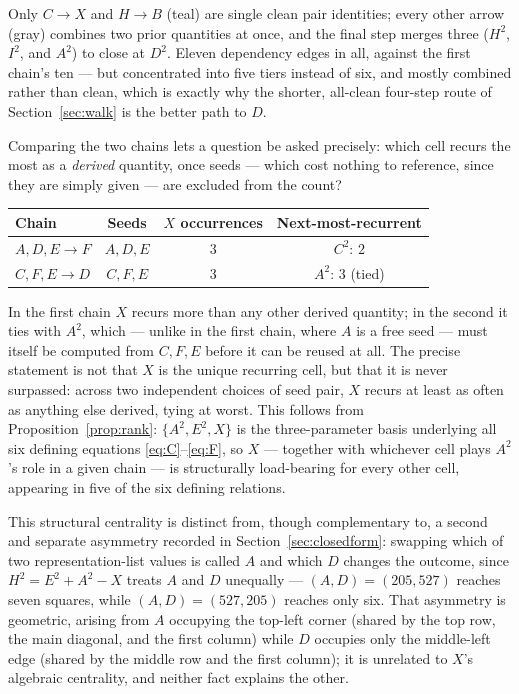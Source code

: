 \documentclass[12pt]{article}
\theoremstyle{remark}
\begin{document}
Only $C \to X$ and $H \to B$ (teal) are single clean pair identities;
every other arrow (gray) combines two prior quantities at once, and
the final step merges three ($H^2$, $I^2$, and $A^2$) to close at
$D^2$. Eleven dependency edges in all, against the first chain's ten
--- but concentrated into five tiers instead of six, and mostly
combined rather than clean, which is exactly why the shorter,
all-clean four-step route of Section~\ref{sec:walk} is the better path
to $D$.

Comparing the two chains lets a question be asked precisely: which
cell recurs the most as a \emph{derived} quantity, once seeds --- which
cost nothing to reference, since they are simply given --- are excluded
from the count?

\begin{center}
\begin{tabular}{lccc}
\hline
Chain & Seeds & $X$ occurrences & Next-most-recurrent \\
\hline
$A,D,E \to F$ & $A,D,E$ & $3$ & $C^2$: $2$ \\
$C,F,E \to D$ & $C,F,E$ & $3$ & $A^2$: $3$ (tied) \\
\hline
\end{tabular}
\end{center}

In the first chain $X$ recurs more than any other derived quantity; in
the second it ties with $A^2$, which --- unlike in the first chain,
where $A$ is a free seed --- must itself be computed from $C,F,E$
before it can be reused at all. The precise statement is not that $X$
is the unique recurring cell, but that it is never surpassed: across
two independent choices of seed pair, $X$ recurs at least as often as
anything else derived, tying at worst. This follows from
Proposition~\ref{prop:rank}: $\{A^2,E^2,X\}$ is the three-parameter
basis underlying all six defining equations
\eqref{eq:C}--\eqref{eq:F}, so $X$ --- together with whichever cell
plays $A^2$'s role in a given chain --- is structurally load-bearing
for every other cell, appearing in five of the six defining relations.

This structural centrality is distinct from, though complementary to,
a second and separate asymmetry recorded in
Section~\ref{sec:closedform}: swapping which of two representation-list
values is called $A$ and which $D$ changes the outcome, since
$H^2=E^2+A^2-X$ treats $A$ and $D$ unequally --- $(A,D)=(205,527)$
reaches seven squares, while $(A,D)=(527,205)$ reaches only six. That
asymmetry is geometric, arising from $A$ occupying the top-left corner
(shared by the top row, the main diagonal, and the first column) while
$D$ occupies only the middle-left edge (shared by the middle row and
the first column); it is unrelated to $X$'s algebraic centrality, and
neither fact explains the other.
\end{document}
